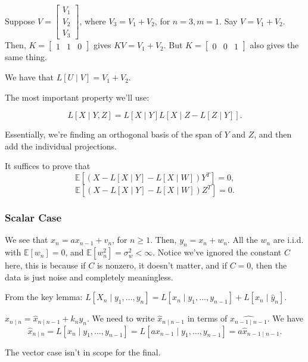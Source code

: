 \documentclass{article}
\newcommand{\EE}{\mathbb{E}}
\begin{document}
\begin{example}
	Suppose $V = \begin{bmatrix} V_1 \\ V_2 \\ V_3 \end{bmatrix}$, where $V_3 = V_1 + V_2$, for $n = 3, m = 1$. Say $V = V_1 + V_2$. Then, $K = \begin{bmatrix} 1 & 1 & 0 \end{bmatrix}$ gives $KV = V_1 + V_2$. But $K = \begin{bmatrix} 0 & 0 & 1 \end{bmatrix}$ also gives the same thing. 

	We have that $L[U \mid V] = V_1 + V_2$.
\end{example}

The most important property we'll use: 
\begin{lemma}
\[L[X \mid Y, Z] = L[X \mid Y] L[X \mid Z - L[Z \mid Y]].\]
\end{lemma}
Essentially, we're finding an orthogonal basis of the span of $Y$ and $Z$, and then add the individual projections.

It suffices to prove that
\[\EE[(X - L[X \mid Y] - L[X \mid W]) Y^T] = 0,\] 
\[\EE[(X - L[X \mid Y] - L[X \mid W]) Z^T] = 0.\]

\subsubsection{Scalar Case} 
We see that $x_n = a x_{n-1} + v_n$, for $n \geq 1$. Then, $y_n = x_n + w_n$. All the $w_n$ are i.i.d. with $\EE[w_n] = 0$, and $\EE[w_n^2] = \sigma_{w}^2 < \infty$. 
Notice we've ignored the constant $C$ here, this is because if $C$ is nonzero, it doesn't matter, and if $C = 0$, then the data is just noise and completely meaningless.

From the key lemma:
$L[X_n \mid y_1, \ldots, y_n] = L[x_n \mid y_1, \ldots, y_{n - 1}] + L[x_n \mid \hat{y}_n]$. 

$\hat{x}_{n \mid n} = \hat{x}_{n \mid n - 1} + k_n y_n$. We need to write $\hat{x}_{n \mid n-1}$ in terms of $\hat{x_{n - 1 \mid n - 1}}$. We have 
\[\hat{x}_{n \mid n} = L[x_n \mid y_1, \ldots, y_{n - 1}] = L[ax_{n - 1} \mid y_1, \ldots, y_{n-1}] = a\hat{x}_{n-1 \mid n-1}.\]

The vector case isn't in scope for the final.
\end{document}

